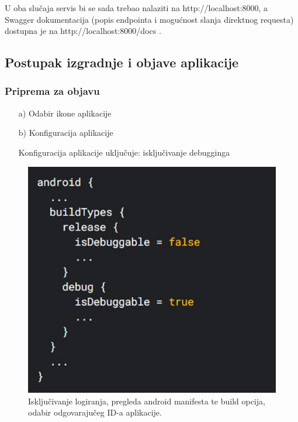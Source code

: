 		
		U oba slučaja servis bi se sada trebao nalaziti na http://localhost:8000, a Swagger dokumentacija (popis endpointa i mogućnost slanja direktnog requesta) dostupna je na http://localhost:8000/docs .
		
		\subsection{Postupak izgradnje i objave aplikacije}
		
		\subsubsection{Priprema za objavu}
		\begin{enumerate}
			\item[a)] Odabir ikone aplikacije
			\item[b)] Konfiguracija aplikacije
			
			Konfiguracija aplikacije uključuje: isključivanje debugginga
		\end{enumerate}
		
		\begin{figure}[H]
			\includegraphics[scale=0.6]{slike/deploy2.jpg} %
			\centering
			\caption{Isključivanje logiranja, pregleda android manifesta te build opcija, odabir odgovarajučeg ID-a aplikacije.}
			\label{fig:deploy2}
		\end{figure}
		
